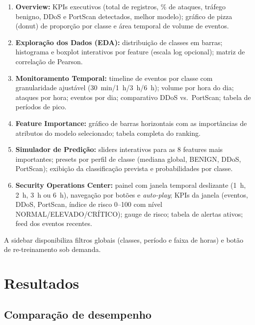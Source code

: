 \documentclass[12pt,a4paper]{article}
\begin{document}
\begin{enumerate}
  \item \textbf{Overview:} KPIs executivos (total de registros, \% de ataques,
        tráfego benigno, DDoS e PortScan detectados, melhor modelo); gráfico
        de pizza (donut) de proporção por classe e área temporal de volume de
        eventos.
  \item \textbf{Exploração dos Dados (EDA):} distribuição de classes em
        barras; histograma e boxplot interativos por feature (escala log
        opcional); matriz de correlação de Pearson.
  \item \textbf{Monitoramento Temporal:} timeline de eventos por classe com
        granularidade ajustável (30~min/1~h/3~h/6~h); volume por hora do dia;
        ataques por hora; eventos por dia; comparativo DDoS vs.~PortScan;
        tabela de períodos de pico.
  \item \textbf{Feature Importance:} gráfico de barras horizontais com as
        importâncias de atributos do modelo selecionado; tabela completa do
        ranking.
  \item \textbf{Simulador de Predição:} sliders interativos para as 8 features
        mais importantes; presets por perfil de classe (mediana global,
        BENIGN, DDoS, PortScan); exibição da classificação prevista e
        probabilidades por classe.
  \item \textbf{Security Operations Center:} painel com janela temporal
        deslizante (1~h, 2~h, 3~h ou 6~h), navegação por botões e
        \emph{auto-play}; KPIs da janela (eventos, DDoS, PortScan, índice de
        risco 0--100 com nível NORMAL/ELEVADO/CRÍTICO); gauge de risco;
        tabela de alertas ativos; feed dos eventos recentes.
\end{enumerate}

A sidebar disponibiliza filtros globais (classes, período e faixa de horas)
e botão de re-treinamento sob demanda.

\section{Resultados}

\subsection{Comparação de desempenho}
\end{document}
